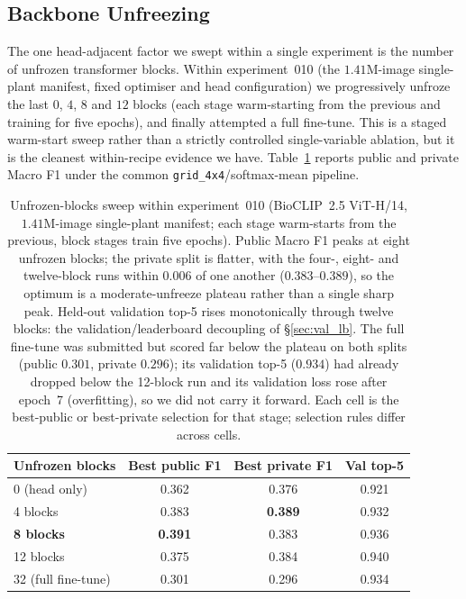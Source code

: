 \subsection{Backbone Unfreezing}
\label{sec:blocks_ablation}

The one head-adjacent factor we swept within a single experiment is the number of unfrozen
transformer blocks. Within experiment~010 (the $1.41$M-image single-plant manifest, fixed optimiser
and head configuration) we progressively unfroze the last $0$, $4$, $8$ and $12$ blocks (each
stage warm-starting from the previous and training for five epochs), and finally attempted a full
fine-tune. This is a staged warm-start sweep rather than a strictly controlled single-variable
ablation, but it is the cleanest within-recipe evidence we have. Table~\ref{tab:blocks} reports
public and private Macro F1 under the common \texttt{grid\_4x4}/softmax-mean pipeline.

\begin{table}[ht]
  \centering
  \small
  \begin{tabular}{lccc}
    \toprule
    Unfrozen blocks & Best public F1 & Best private F1 & Val top-5 \\
    \midrule
    0 (head only)        & 0.362 & 0.376 & 0.921 \\
    4 blocks             & 0.383 & \textbf{0.389} & 0.932 \\
    \textbf{8 blocks}    & \textbf{0.391} & 0.383 & 0.936 \\
    12 blocks            & 0.375 & 0.384 & 0.940 \\
    32 (full fine-tune)  & 0.301 & 0.296 & 0.934 \\
    \bottomrule
  \end{tabular}
  \caption{Unfrozen-blocks sweep within experiment~010 (BioCLIP~2.5 ViT-H/14, $1.41$M-image single-plant manifest; each stage warm-starts from the previous, block stages train five epochs). Public Macro F1 peaks at eight unfrozen blocks; the private split is flatter, with the four-, eight- and twelve-block runs within $0.006$ of one another ($0.383$--$0.389$), so the optimum is a moderate-unfreeze plateau rather than a single sharp peak. Held-out validation top-5 rises monotonically through twelve blocks: the validation/leaderboard decoupling of \S\ref{sec:val_lb}. The full fine-tune was submitted but scored far below the plateau on both splits (public $0.301$, private $0.296$); its validation top-5 ($0.934$) had already dropped below the 12-block run and its validation loss rose after epoch~7 (overfitting), so we did not carry it forward. Each cell is the best-public or best-private selection for that stage; selection rules differ across cells.}
  \label{tab:blocks}
\end{table}

